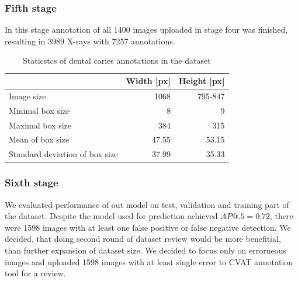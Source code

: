 \subsubsection{Fifth stage}
In this stage annotation of all 1400 images uploaded in stage four was finished, resulting in 3989 X-rays with 7257 annotations.

\begin{table}
    \centering
    \begin{tabular}{l|r|r}
                                       & Width [px] & Height [px] \\\hline
        Image size                     & 1068       & 795-847     \\ \hline
        Minimal box size               & 8          & 9           \\ \hline
        Maximal box size               & 384        & 315         \\ \hline
        Mean of box size               & 47.55      & 53.15       \\ \hline
        Standard deviation of box size & 37.99      & 35.33       \\ \hline
    \end{tabular}
    \caption{\label{tab:dataset_statistics}Staticstcs of dental caries annotations in the dataset}
\end{table}

\subsubsection{Sixth stage}
We evaluated performance of out model on test, validation and training part of the dataset. Despite the model used for prediction achieved $AP@.5 = 0.72$, there were 1598 images with at least one false positive or false negative detection. We decided, that doing second round of dataset review would be more benefitial, than further expansion of dataset size. We decided to focus only on errorneous images and uploaded 1598 images with at least single error to CVAT annotation tool for a review.

\

